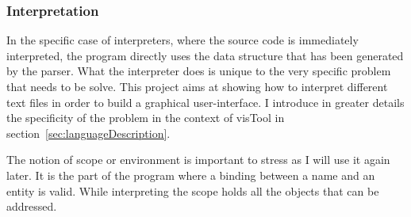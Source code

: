 
\subsubsection{Interpretation}

In the specific case of interpreters, where the source code is immediately interpreted, the program directly uses the data structure that has been generated by the parser. What the interpreter does is unique to the very specific problem that needs to be solve. This project aims at showing how to interpret different text files in order to build a graphical user-interface. I introduce in greater details the specificity of the problem in the context of visTool in section~\ref{sec:languageDescription}.

The notion of scope or environment is important to stress as I will use it again later. It is the part of the program where a binding between a name and an entity is valid. While interpreting the scope holds all the objects that can be addressed.